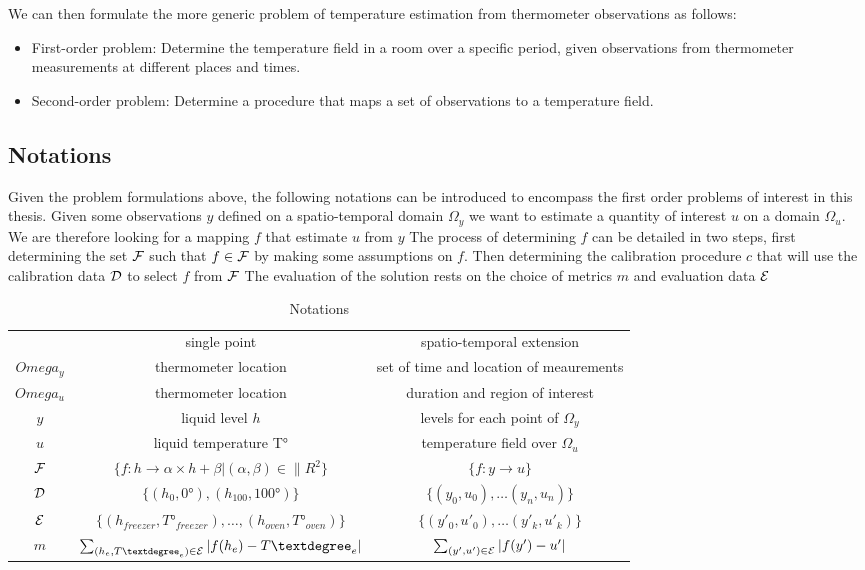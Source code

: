 \begin{bibunit}
We can then formulate the more generic problem of temperature estimation from thermometer observations as follows:

\begin{itemize}
    \item First-order problem: Determine the temperature field in a room over a specific period, given observations from thermometer measurements at different places and times.
    \item Second-order problem: Determine a procedure that maps a set of observations to a temperature field.
\end{itemize}

\subsection{Notations}
Given the problem formulations above, the following notations can be introduced to encompass the first order problems of interest in this thesis.
Given some observations $y$ defined on a spatio-temporal domain $\Omega_y$ we want to estimate a quantity of interest $u$ on a domain $\Omega_u$. We are therefore looking for a mapping $f$ that estimate $u$ from $y$
The process of determining $f$ can be detailed in two steps, first determining the set $\cal{F}$ such that $f \in \cal{F}$ by making some assumptions on $f$. Then determining the calibration procedure $c$ that will use the calibration data $\cal{D}$ to select $f$ from $\cal{F}$
The evaluation of the solution rests on the choice of metrics $m$ and evaluation data $\cal{E}$

\begin{table}
\begin{tabular}{c|c|c}
   & single point & spatio-temporal extension\\
  $Omega_y$ & thermometer location& set of time and location of meaurements\\
  $Omega_u$ & thermometer location& duration and region of interest\\
  $y$ & liquid level $h$ & levels for each point of $\Omega_y$\\
  $u$ & liquid temperature T° &  temperature field over $\Omega_u$\\
  $\cal{F}$ & $\{ f: h \to \alpha \times h + \beta | (\alpha, \beta) \in \|R^2\}$ &  $\{f: y \to u\}$\\
  $\cal{D}$ & $\{(h_{0}, 0°), (h_{100}, 100°)\}$ & $\{(y_0, u_0), \dots (y_n, u_n)\}$\\
  $\cal{E}$ & $\{(h_{freezer}, T°_{freezer}), \dots, (h_{oven}, T°_{oven})\}$ & $\{(y'_0, u'_0), \dots (y'_k, u'_k)\}$\\
  $m$ & $\sum_{(h_e, T°_e)\in\cal{E}} |f(h_e) - T°_e|$ & $\sum_{(y', u')\in\cal{E}} |f(y') - u'|$ \\
\end{tabular}
    \centering
    \caption{Notations }
    \label{table:notations}
\end{table}


\end{bibunit}
